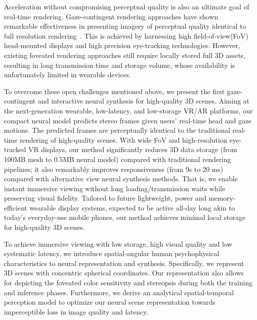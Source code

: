 Acceleration without compromising perceptual quality is also an ultimate goal of real-time rendering.
Gaze-contingent rendering approaches have shown remarkable effectiveness in presenting imagery of perceptual quality identical to full resolution rendering~\cite{Guenter:2012:F3G,Patney:2016:TFR,Tursun:2019:LCA}. This is achieved by harnessing high field-of-view(FoV) head-mounted displays and high precision eye-tracking technologies. However, existing foveated rendering approaches still require locally stored full 3D assets, resulting in long transmission time and storage volume, whose availability is unfortunately limited in wearable devices.


To overcome these open challenges mentioned above, we present the first gaze-contingent and interactive neural synthesis for high-quality 3D scenes. Aiming at the next-generation wearable, low-latency, and low-storage VR/AR platforms, our compact neural model predicts stereo frames given users' real-time head and gaze motions. The predicted frames are perceptually identical to the traditional real-time rendering of high-quality scenes.
With wide FoV and high-resolution eye-tracked VR displays, our method significantly reduces 3D data storage (from 100MB mesh to 0.5MB neural model) compared with traditional rendering pipelines; it also remarkably improves responsiveness (from 9s to 20 ms) compared with alternative view neural synthesis methods. That is, we enable instant immersive viewing without long loading/transmission waits while preserving visual fidelity.
Tailored to future lightweight, power and memory-efficient wearable display systems, expected to be active all-day long akin to today's everyday-use mobile phones, our method achieves minimal local storage for high-quality 3D scenes.  %


To achieve immersive viewing with low storage, high visual quality and low systematic latency, we introduce spatial-angular human psychophysical characteristics to neural representation and synthesis. 
Specifically, we represent 3D scenes with concentric spherical coordinates. Our representation also allows for depicting the foveated color sensitivity and stereopsis during both the training and inference phases. 
Furthermore, we derive an analytical spatial-temporal perception model to optimize our neural scene representation towards imperceptible loss in image quality and latency.

